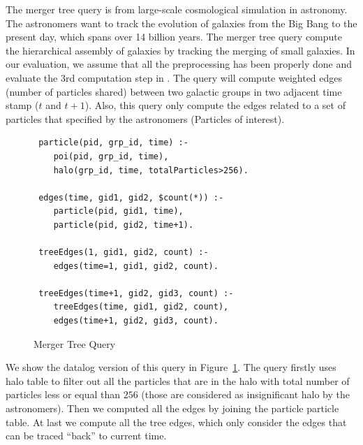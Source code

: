 The merger tree query is from large-scale cosmological simulation in astronomy.
The astronomers want to track the evolution of galaxies from the Big Bang
to the present day, which spans over 14 billion years. The merger tree query 
compute the hierarchical assembly of galaxies by tracking the merging of 
small galaxies. In our evaluation, we assume that all the preprocessing has
been properly done and evaluate the 3rd computation step
 in \cite{LoebmanOCOAHBQG14SIGMOD}. The query will compute weighted edges
 (number of particles shared) between two galactic groups in two adjacent time
 stamp ($t$ and $t+1$). Also, this query only compute the edges related to a 
 set of particles that specified by the astronomers (Particles of interest).

 \begin{figure}[t]
 \begin{verbatim}
 particle(pid, grp_id, time) :- 
    poi(pid, grp_id, time), 
    halo(grp_id, time, totalParticles>256).
 
 edges(time, gid1, gid2, $count(*)) :-
    particle(pid, gid1, time), 
    particle(pid, gid2, time+1).
 
 treeEdges(1, gid1, gid2, count) :- 
    edges(time=1, gid1, gid2, count).

 treeEdges(time+1, gid2, gid3, count) :-
    treeEdges(time, gid1, gid2, count), 
    edges(time+1, gid2, gid3, count). 
 \end{verbatim}
 \caption{Merger Tree Query}
 \label{fig:merger-tree}
 \end{figure}

We show the datalog version of this query in Figure~\ref{fig:merger-tree}. 
The query firstly uses halo table to filter out all the particles that are 
in the halo with total number of particles less or equal than $256$ 
(those are considered as insignificant halo by the astronomers). 
Then we computed all the edges by joining the particle particle table.
At last we compute all the tree edges, which only consider the edges that can
be traced ``back'' to current time. 
